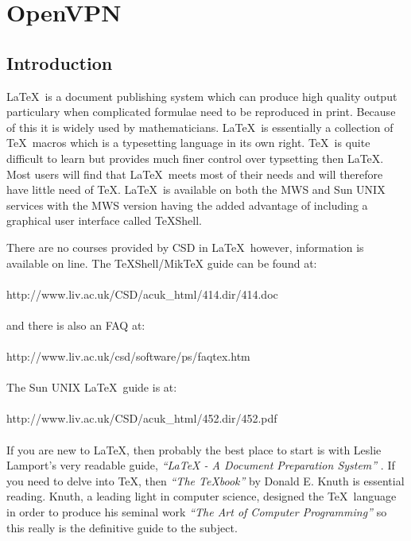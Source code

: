 \documentclass[11pt,oneside]{book}
\begin{document}
\printglossary


\mainmatter

\chapter{OpenVPN}
\section{Introduction}

\LaTeX \ is a document publishing system which can produce high quality
output particulary when complicated formulae need to be reproduced in print.
Because of this it is widely used by mathematicians. \LaTeX \ is essentially
a collection of \TeX \ macros which is a typesetting language in its own right.
\TeX \ is quite difficult to learn but provides much finer control over typsetting
then \LaTeX. Most users will find that \LaTeX \ meets most of their
needs and will therefore have little need of \TeX. \LaTeX \ is available on
both the MWS and Sun UNIX services with the MWS
version having the added advantage of including a graphical user interface called
TeXShell.

There are no courses provided by CSD in \LaTeX \ however, information is available
on line. The TeXShell/MikTeX guide can be found at:
\\
\\
http://www.liv.ac.uk/CSD/acuk\_html/414.dir/414.doc
\\
\\
and there is also an FAQ at:
\\
\\
http://www.liv.ac.uk/csd/software/ps/faqtex.htm
\\
\\
The Sun UNIX \LaTeX \ guide is at:
\\
\\
http://www.liv.ac.uk/CSD/acuk\_html/452.dir/452.pdf
\\
\\
If you are new to \LaTeX, then probably the best place to start is with
Leslie Lamport's very readable guide, {\em ``LaTeX - A Document Preparation
System''} \cite{latex} . If you need to delve into \TeX, then {\em ``The TeXbook''} \cite{texbook} by
Donald E. Knuth is essential reading. Knuth, a leading light in
computer science, designed the \TeX \ language in order to produce
his seminal work {\em ``The Art of Computer Programming''} \cite{artbook} so this really
is the definitive guide to the subject.
\end{document}
